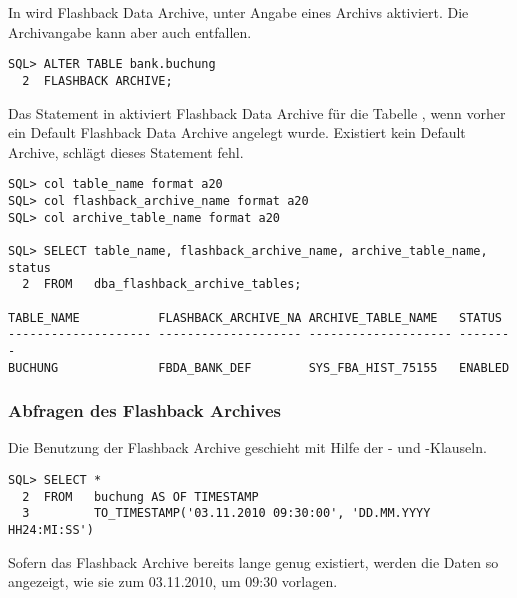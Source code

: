           In  wird Flashback Data Archive, unter Angabe eines Archivs aktiviert. Die Archivangabe kann aber auch entfallen.
          \begin{lstlisting}[caption={Flashback Data Archive mit einem Default Archive aktivieren},label=admin1731,language=oracle_sql]
SQL> ALTER TABLE bank.buchung
  2  FLASHBACK ARCHIVE;
          \end{lstlisting}
          Das Statement in  aktiviert Flashback Data Archive für die Tabelle , wenn vorher ein Default Flashback Data Archive angelegt wurde. Existiert kein Default Archive, schlägt dieses Statement fehl.
          \begin{lstlisting}[caption={Welche Archive wurden benutzt?},label=admin1732,language=oracle_sql,alsolanguage=sqlplus]
SQL> col table_name format a20
SQL> col flashback_archive_name format a20
SQL> col archive_table_name format a20

SQL> SELECT table_name, flashback_archive_name, archive_table_name, status
  2  FROM   dba_flashback_archive_tables;

TABLE_NAME           FLASHBACK_ARCHIVE_NA ARCHIVE_TABLE_NAME   STATUS
-------------------- -------------------- -------------------- --------
BUCHUNG              FBDA_BANK_DEF        SYS_FBA_HIST_75155   ENABLED
          \end{lstlisting}
\clearpage
        \subsubsection{Abfragen des Flashback Archives}
          Die Benutzung der Flashback Archive geschieht mit Hilfe der - und -Klauseln.
          \begin{lstlisting}[caption={Flashback Data Archive mit einem Default Archive aktivieren},label=admin1733,language=oracle_sql]
SQL> SELECT *
  2  FROM   buchung AS OF TIMESTAMP
  3         TO_TIMESTAMP('03.11.2010 09:30:00', 'DD.MM.YYYY HH24:MI:SS')
          \end{lstlisting}
          Sofern das Flashback Archive bereits lange genug existiert, werden die Daten so angezeigt, wie sie zum 03.11.2010, um 09:30 vorlagen.

